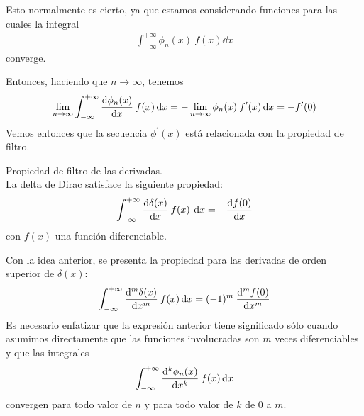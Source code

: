 \documentclass[12pt]{beamer}
\begin{document}
Esto normalmente es cierto, ya que estamos considerando funciones para las cuales la integral
\begin{align*}
\int_{-\infty}^{+\infty} \phi_{n}(x) \: f(x) \dd{x} 
\end{align*}
converge.
\par
Entonces, haciendo que $n \to \infty$, tenemos
\begin{align*}
\lim_{n \to \infty} \int_{-\infty}^{+\infty} \dv{\phi_{n}(x)}{x} \: f(x) \dd{x} = - \lim_{n \to \infty} \phi_{n}(x) \: f^{\prime} (x) \dd{x} =  -f^{\prime}(0)
\end{align*}
Vemos entonces que la secuencia $\phi^{\prime}(x)$ está relacionada con la propiedad de filtro.
\begin{propiedad}
Propiedad de filtro de las derivadas.
\\
La delta de Dirac satisface la siguiente propiedad:
\[ \int_{-\infty}^{+\infty} \dv{\delta(x)}{x} \: f(x) \: \dd{x} = - \dv{f(0)}{x} \]
con $f(x)$ una función diferenciable.
\par
Con la idea anterior, se presenta la propiedad para las derivadas de orden superior de $\delta (x)$:
\begin{align*}
\int_{-\infty}^{+\infty} \dv[m]{\delta (x)}{x} \: f(x) \dd{x} =  (-1)^{m} \: \dv[m]{f(0)}{x}
\end{align*}
Es necesario enfatizar que la expresión anterior tiene significado sólo cuando asumimos directamente que las funciones involucradas son $m$ veces diferenciables y que las integrales
\begin{align*}
\int_{-\infty}^{+\infty} \dv[k]{\phi_{n}(x)}{x} \: f(x) \dd{x}
\end{align*}
convergen para todo valor de $n$ y para todo valor de $k$ de $0$ a $m$.
\end{propiedad}
\end{document}
